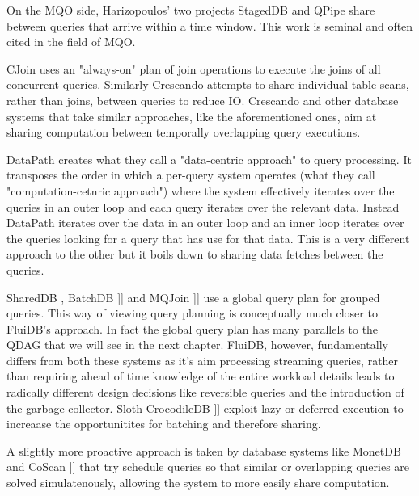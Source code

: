 On the MQO side, Harizopoulos' two projects StagedDB
\cite{harizopoulosStagedDBDesigningDatabase2005} and QPipe
\cite{harizopoulosQpipeSimultaneouslyPipelined2005} share between
queries that arrive within a time window. This work is seminal and
often cited in the field of MQO.

CJoin \cite{candeaScalablePredictableJoin2009} uses an "always-on" plan
of join operations to execute the joins of all concurrent
queries. Similarly Crescando \cite{giannikisCrescando2010} attempts to
share individual table scans, rather than joins, between queries to
reduce IO. Crescando and other database systems that take similar
approaches, like the aforementioned ones, aim at sharing computation
between temporally overlapping query executions.

DataPath \cite{arumugamDataPathSystemDatacentric2010} creates what they
call a "data-centric approach" to query processing. It transposes the
order in which a per-query system operates (what they call
"computation-cetnric approach") where the system effectively iterates
over the queries in an outer loop and each query iterates over the
relevant data. Instead DataPath iterates over the data in an outer
loop and an inner loop iterates over the queries looking for a query
that has use for that data. This is a very different approach to the
other but it boils down to sharing data fetches between the queries.

SharedDB \cite{giannikisSharedDBKillingOne2012}, BatchDB
\cite{makreshanskiBatchDBEfficientIsolated2017}]] and MQJoin
\cite{makreshanskiMqjoinEfficientShared2016a}]] use a global query plan
for grouped queries. This way of viewing query planning is
conceptually much closer to FluiDB's approach. In fact the global
query plan has many parallels to the QDAG that we will see in the next
chapter. FluiDB, however, fundamentally differs from both these
systems as it's aim processing streaming queries, rather than
requiring ahead of time knowledge of the entire workload details leads
to radically different design decisions like reversible queries and
the introduction of the garbage collector.  Sloth
\cite{cheungSlothBeingLazy2016} CrocodileDB
\cite{shangCrocodileDBEfficientDatabase2020}]] exploit lazy or deferred
execution to increaase the opportunitites for batching and therefore
sharing.

A slightly more proactive approach is taken by database systems like
MonetDB \cite{idreosMonetdbTwoDecades2012} and CoScan
\cite{wangCoscanCooperativeScan2011}]] that try schedule queries so
that similar or overlapping queries are solved simulatenously,
allowing the system to more easily share computation.

